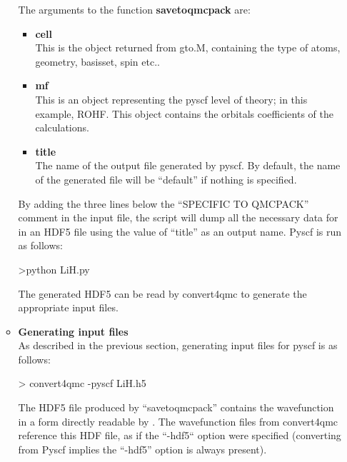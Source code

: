 \begin{itemize}
\begin{itemize}
\begin{shade}
\end{shade}

The arguments to the function \textbf{savetoqmcpack} are:\\
\begin{itemize}
 \item \textbf{cell}\\
 This is the object returned from gto.M, containing the type of atoms, geometry, basisset, spin etc.. \\
 \item \textbf{mf}\\
This is an object representing the pyscf level of theory; in this example, ROHF. This object contains the orbitals coefficients of the calculations. \\
 \item \textbf{title}\\
 The name of the output file generated by pyscf. By default, the name of the generated file will be ``default'' if nothing is specified.\\
 \end{itemize}

By adding the three lines below the ``SPECIFIC TO QMCPACK'' comment  in the input file, the script will dump all the necessary data for \qmcpack in an HDF5 file using the value of ``title'' as an output name. Pyscf is run as follows:\\
\begin{shade}
 >python LiH.py
\end{shade}


The generated HDF5 can be read by convert4qmc to generate the appropriate \qmcpack input files.\\

 \item \textbf{Generating input files}\\
 
 As described in the previous section, generating input files for pyscf is as follows:\\
 \begin{shade}
  > convert4qmc -pyscf LiH.h5 
 \end{shade}

The HDF5 file produced by ``savetoqmcpack'' contains the wavefunction in a form directly readable by \qmcpack.
The wavefunction files from convert4qmc reference this HDF file, as if the ``-hdf5`` option were specified
(converting from Pyscf implies the ``-hdf5'' option is always present).

\end{itemize}


\end{itemize}
